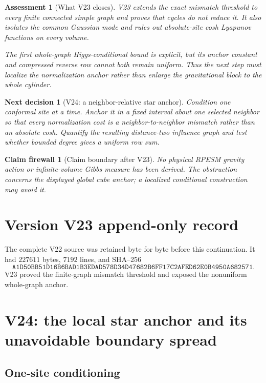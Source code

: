 \documentclass[11pt]{article}
\newtheorem{firewall}[theorem]{Claim firewall}
\newtheorem{decision}[theorem]{Next decision}
\newtheorem{assessment}[theorem]{Assessment}
\theoremstyle{remark}
\begin{document}
\begin{assessment}[What V23 closes]
\label{ass:v17v23-status}
V23 extends the exact mismatch threshold to every finite connected
simple graph and proves that cycles do not reduce it.  It also isolates
the common Gaussian mode and rules out absolute-site cosh Lyapunov
functions on every volume.

The first whole-graph Higgs-conditional bound is explicit, but its
anchor constant and compressed reverse row cannot both remain uniform.
Thus the next step must localize the normalization anchor rather than
enlarge the gravitational block to the whole cylinder.
\end{assessment}

\begin{decision}[V24: a neighbor-relative star anchor]
\label{dec:v17v23-next}
Condition one conformal site at a time.  Anchor it in a fixed interval
about one selected neighbor so that every normalization cost is a
neighbor-to-neighbor mismatch rather than an absolute cosh.  Quantify
the resulting distance-two influence graph and test whether bounded
degree gives a uniform row sum.
\end{decision}

\begin{firewall}[Claim boundary after V23]
\label{fire:v17v23}
No physical RPESM gravity action or infinite-volume Gibbs measure has
been derived.  The obstruction concerns the displayed global cube
anchor; a localized conditional construction may avoid it.
\end{firewall}

\section*{Version V23 append-only record}
The complete V22 source was retained byte for byte before this
continuation.  It had \(227611\) bytes, \(7192\) lines, and SHA--256
\[
 \texttt{A1D50BB51D16B6BAD1B3EDAD578D34D47682B6FF17C2AFED62E0B4950A682571}.
\]
V23 proved the finite-graph mismatch threshold and exposed the
nonuniform whole-graph anchor.


\section{V24: the local star anchor and its unavoidable boundary spread}
\label{sec:v17v24}

\subsection{One-site conditioning}
\end{document}
